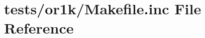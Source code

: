 \hypertarget{tests_2or1k_2_makefile_8inc}{\section{tests/or1k/\+Makefile.inc File Reference}
\label{tests_2or1k_2_makefile_8inc}
}
